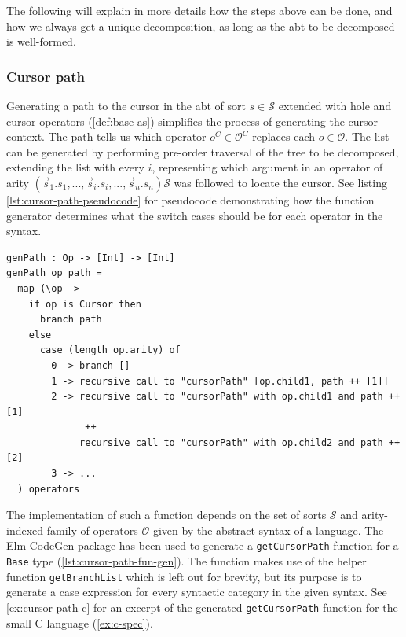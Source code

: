 The following will explain in more details how the steps above can be done,
and how we always get a unique decomposition, as long as the abt to be decomposed is well-formed.

\subsubsection{Cursor path}

Generating a path to the cursor in the abt of sort $s \in \mathcal{S}$ extended with
hole and cursor operators (\cref{def:base-as})
simplifies the process of generating the cursor context. The path tells us
which operator $o^C \in \mathcal{O}^C$ replaces each $o \in \mathcal{O}$.
The list can be generated by performing pre-order traversal of the tree to be decomposed,
extending the list with every $i$, representing which argument in an operator of
arity $(\vec{s}_1.s_1, ... , \vec{s}_i.s_i, ..., \vec{s}_n.s_n)\mathcal{S}$ was
followed to locate the cursor. See listing \cref{lst:cursor-path-pseudocode} for
pseudocode demonstrating how the function generator determines what the
switch cases should be for each operator in the syntax.

\begin{minipage}{\pdfpagewidth}
\begin{lstlisting}[style=inline,caption={Cursor path generation pseudocode},label={lst:cursor-path-pseudocode}]
genPath : Op -> [Int] -> [Int]
genPath op path =
  map (\op ->
    if op is Cursor then 
      branch path
    else
      case (length op.arity) of
        0 -> branch []
        1 -> recursive call to "cursorPath" [op.child1, path ++ [1]]
        2 -> recursive call to "cursorPath" with op.child1 and path ++ [1]
              ++
             recursive call to "cursorPath" with op.child2 and path ++ [2]
        3 -> ...
  ) operators
\end{lstlisting}
\end{minipage}

The implementation of such a function depends on the set of sorts $\mathcal{S}$
and arity-indexed family of operators $\mathcal{O}$ given by the abstract syntax
of a language. The Elm CodeGen package\cite{elm-codegen-package} has been used to
generate a \texttt{getCursorPath} function for a \texttt{Base} type (\cref{lst:cursor-path-fun-gen}). The function makes use of the helper function
\texttt{getBranchList} which is left out for brevity, but its purpose is
to generate a case expression for every syntactic category in the given syntax.
See \cref{ex:cursor-path-c} for an excerpt of the generated \texttt{getCursorPath}
function for the small C language (\cref{ex:c-spec}).


